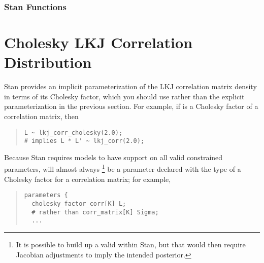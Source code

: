 
\subsubsection{Stan Functions}

\begin{description}
%
%
\end{description}
\begin{description}
\end{description}


\section{Cholesky LKJ Correlation Distribution}

Stan provides an implicit parameterization of the LKJ correlation matrix
density in terms of its Cholesky factor, which you should use rather
than the explicit parameterization in the previous section. For example, 
if  is a Cholesky factor of a correlation matrix, then
%
\begin{quote}
\begin{Verbatim}
L ~ lkj_corr_cholesky(2.0);
# implies L * L' ~ lkj_corr(2.0);
\end{Verbatim}
\end{quote}
%
Because Stan requires models to have support on all valid constrained
parameters,  will almost always
%
\footnote{It is possible to build up a valid  within Stan, but that
would then require Jacobian adjustments to imply the intended posterior.}
%
be a parameter declared with the type of a
Cholesky factor for a correlation matrix; for example,
%
\begin{quote}
\begin{Verbatim}
parameters {
  cholesky_factor_corr[K] L; 
  # rather than corr_matrix[K] Sigma;
  ...
\end{Verbatim}
\end{quote}
%


